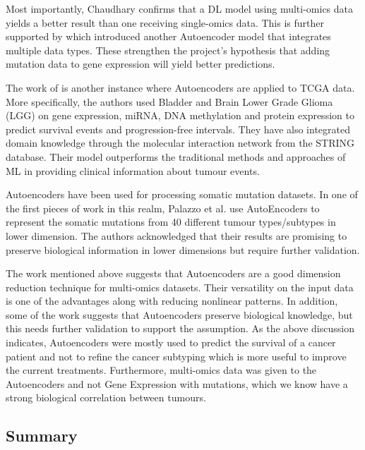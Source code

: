 Most importantly, Chaudhary confirms that a DL model using multi-omics data yields a better result than one receiving single-omics data. This is further supported by \citet{Ma2019-hk} which introduced another Autoencoder model that integrates multiple data types. These strengthen the project's hypothesis that adding mutation data to gene expression will yield better predictions.

The work of \citet{Ma2019-hk} is another instance where Autoencoders are applied to TCGA data. More specifically, the authors used Bladder and Brain Lower Grade Glioma (LGG) on gene expression, miRNA, DNA methylation and protein expression to predict survival events and progression-free intervals. They have also integrated domain knowledge through the molecular interaction network from the STRING database. Their model outperforms the traditional methods and approaches of ML in providing clinical information about tumour events.

Autoencoders have been used for processing somatic mutation datasets. In one of the first pieces of work in this realm, Palazzo et al. \cite{Palazzo2019-hx} use AutoEncoders to represent the somatic mutations from 40 different tumour types/subtypes in lower dimension. The authors acknowledged that their results are promising to preserve biological information in lower dimensions but require further validation.


The work mentioned above suggests that Autoencoders are a good dimension reduction technique for multi-omics datasets. Their versatility on the input data is one of the advantages along with reducing nonlinear patterns. In addition, some of the work suggests that Autoencoders preserve biological knowledge, but this needs further validation to support the assumption. As the above discussion indicates, Autoencoders were mostly used to predict the survival of a cancer patient and not to refine the cancer subtyping which is more useful to improve the current treatments. Furthermore, multi-omics data was given to the Autoencoders and not Gene Expression with mutations, which we know have a strong biological correlation between tumours.

\subsection{Summary}

